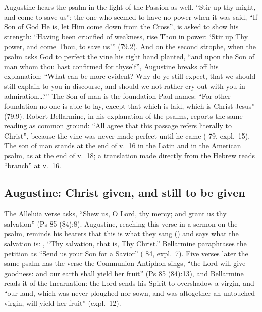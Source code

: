 Augustine hears the psalm in the light of the Passion as well. ``Stir up thy
might, and come to save us'': the one who seemed to have no power when it was
said, ``If Son of God He is, let Him come down from the Cross'', is asked to
show his strength: ``Having been crucified of weakness, rise Thou in power:
`Stir up Thy power, and come Thou, to save us''' (79.2). And on the second
strophe, when the psalm asks God to perfect the vine his right hand planted,
``and upon the Son of man whom thou hast confirmed for thyself'', Augustine
breaks off his explanation: ``What can be more evident? Why do ye still
expect, that we should still explain to you in discourse, and should we not
rather cry out with you in admiration\ldots?'' The Son of man is the
foundation Paul names: ``For other foundation no one is able to lay, except
that which is laid, which is Christ Jesus'' (79.9). Robert Bellarmine, in his
explanation of the psalms, reports the same reading as common ground: ``All agree that this passage refers literally
to Christ'', because the vine was never made perfect until he came
( 79, expl.~15). The son of man stands at the end
of v.~16 in the Latin and in the American psalm, as at the end of v.~18; a
translation made directly from the Hebrew reads ``branch'' at v.~16.

\subsection{Augustine: Christ given, and still to be given}

The Alleluia verse asks, ``Shew us, O Lord, thy mercy; and grant us thy
salvation'' (Ps 85 (84):8). Augustine, reaching this verse in a sermon on the
psalm, reminds his hearers that this is what they sang () and says what the salvation is:
, ``Thy salvation, that is, Thy Christ.''
Bellarmine paraphrases the petition as ``Send us your Son for a Savior''
( 84, expl.~7). Five verses later the same psalm
has the verse the Communion Antiphon sings, ``the Lord will give goodness:
and our earth shall yield her fruit'' (Ps 85 (84):13), and Bellarmine reads
it of the Incarnation: the Lord sends his Spirit to overshadow a virgin, and
``our land, which was never ploughed nor sown, and was altogether an
untouched virgin, will yield her fruit'' (expl.~12).

